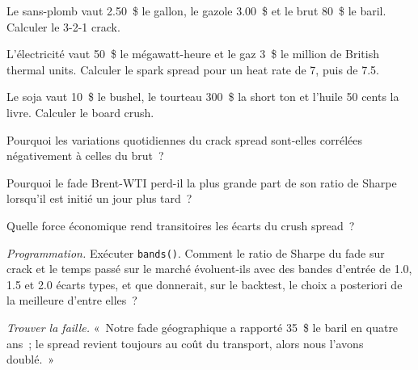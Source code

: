 \begin{exercise}[$\star$]\label{exo:s2:commodity-spreads:1}
Le sans-plomb vaut 2.50~\$ le gallon, le gazole 3.00~\$ et le brut 80~\$ le baril. Calculer le 3-2-1 crack.
\end{exercise}

\begin{exercise}[$\star$]\label{exo:s2:commodity-spreads:2}
L'électricité vaut 50~\$ le mégawatt-heure et le gaz 3~\$ le million de British thermal units. Calculer le spark spread pour un heat rate de 7, puis de 7.5.
\end{exercise}

\begin{exercise}[$\star$]\label{exo:s2:commodity-spreads:3}
Le soja vaut 10~\$ le bushel, le tourteau 300~\$ la short ton et l'huile 50 cents la livre. Calculer le board crush.
\end{exercise}

\begin{exercise}[$\star\star$]\label{exo:s2:commodity-spreads:4}
Pourquoi les variations quotidiennes du crack spread sont-elles corrélées négativement à celles du brut~?
\end{exercise}

\begin{exercise}[$\star\star$]\label{exo:s2:commodity-spreads:5}
Pourquoi le fade Brent-WTI perd-il la plus grande part de son ratio de Sharpe lorsqu'il est initié un jour plus tard~?
\end{exercise}

\begin{exercise}[$\star\star$]\label{exo:s2:commodity-spreads:6}
Quelle force économique rend transitoires les écarts du crush spread~?
\end{exercise}

\begin{exercise}[$\star\star\star$]\label{exo:s2:commodity-spreads:7}
\emph{Programmation.} Exécuter \texttt{bands()}. Comment le ratio de Sharpe du fade sur crack et le temps passé sur le marché évoluent-ils avec des bandes d'entrée de 1.0, 1.5 et 2.0
écarts types, et que donnerait, sur le backtest, le choix a posteriori de la meilleure d'entre elles~?
\end{exercise}

\begin{exercise}[$\star\star\star$]\label{exo:s2:commodity-spreads:8}
\emph{Trouver la faille.} «~Notre fade géographique a rapporté 35~\$ le baril en quatre ans~; le spread revient toujours au coût du transport, alors nous l'avons doublé.~»
\end{exercise}

